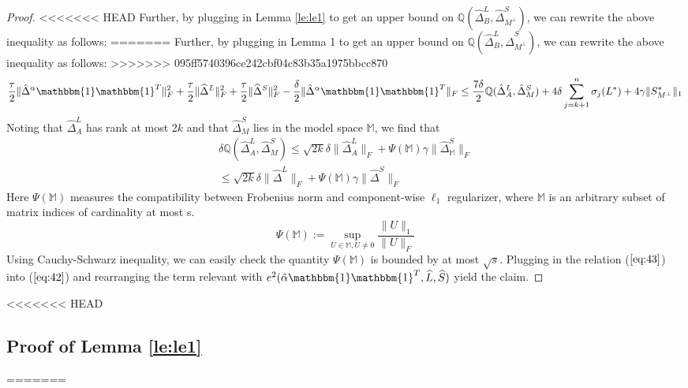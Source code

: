 \documentclass[AMS,STIX1COL]{WileyNJD-v2}
\begin{document}
\begin{proof}
<<<<<<< HEAD
Further, by plugging in Lemma \ref{le:le1} to get an upper bound on  $\mathbb{Q}(\widehat{\Delta}^L_{B},\widehat{\Delta}^S_{M^\perp})$, we can rewrite the above inequality as follows:
=======
Further, by plugging in Lemma 1 to get an upper bound on  $\mathbb{Q}(\widehat{\Delta}^L_{B},\widehat{\Delta}^S_{M^\perp})$, we can rewrite the above inequality as follows:
>>>>>>> 095ff5740396ce242cbf04c83b35a1975bbcc870
\begin{align}
    \frac{\tau}{2} \|\hat{\Delta}^{\alpha}\mathbbm{1}\mathbbm{1}^T\|_{F}^{2} + \frac{\tau}{2} \|\widehat{\Delta}^{L}\|_{F}^{2} + \frac{\tau}{2} \|\widehat{\Delta}^{S}\|_{F}^{2} -
    \frac{\delta}{2} \|\hat{\Delta}^{\alpha}\mathbbm{1}\mathbbm{1}^T\|_{F} 
    \leq 
    \frac{7\delta}{2}\mathbb{Q}(\hat{\Delta}^L_{A},\hat{\Delta}^S_{M}) + 4 \delta \sum_{j=k+1}^{n} \sigma_{j}(L^*) + 4\gamma \|S^*_{M^\perp}\|_{1}  \label{eq:42}
\end{align}
Noting that $\widehat{\Delta}^{L}_{A}$ has rank at most 2$k$ and that $\widehat{\Delta}^{S}_{M}$ lies in the model space $\mathbb{M}$, we find that
\begin{align}
    \nonumber 
    \delta\mathbb{Q}(\widehat{\Delta}^L_{A},\widehat{\Delta}^S_{M}) 
    \leq \sqrt{2k}\delta\|\widehat{\Delta}^L_{A}\|_{F} + \Psi(\mathbb{M})\gamma\|\widehat{\Delta}^S_\mathbb{M}\|_{F}\\
    \leq \sqrt{2k}\delta\|\widehat{\Delta}^L\|_{F} + \Psi(\mathbb{M})\gamma\|\widehat{\Delta}^S\|_{F}  \label{eq:43}
\end{align}
Here $\Psi(\mathbb{M})$ measures the compatibility between Frobenius norm and component-wise $\ell_{1}$ regularizer, where $\mathbb{M}$ is an arbitrary subset of matrix indices of cardinality at most s. 
\[
    \Psi(\mathbb{M}):=\sup\limits_{U\in\mathbb{M},U\neq0}\frac{\|U\|_{1}}{\|U\|_{F}}
\]
Using Cauchy-Schwarz inequality, we can easily check the quantity $\Psi(\mathbb{M})$ is bounded by at most $\sqrt{s}$. Plugging in the relation ($\ref{eq:43}$) into ($\ref{eq:42}$) and rearranging the term relevant with  $e^{2}(\hat{\alpha}\mathbbm{1}\mathbbm{1}^T,\widehat{L},\widehat{S})$ yield the claim.
\end{proof}


<<<<<<< HEAD
\subsection{Proof of Lemma \ref{le:le1}}

=======
\end{document}
